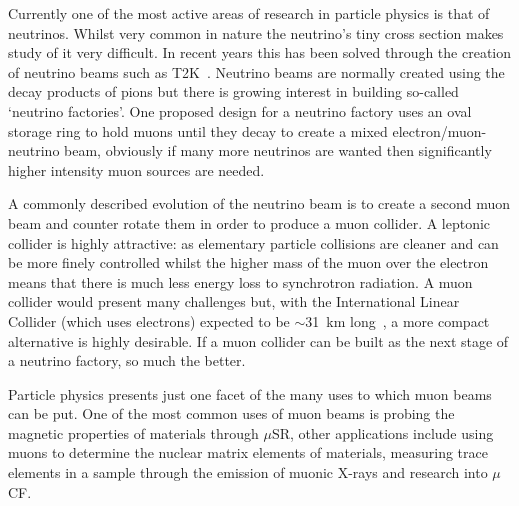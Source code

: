 Currently one of the most active areas of research in particle physics is that of neutrinos. Whilst very common in nature the neutrino's tiny cross section makes study of it very difficult. In recent years this has been solved through the creation of neutrino beams such as T2K~\cite{t2k_cdr}. Neutrino beams are normally created using the decay products of pions but there is growing interest in building so-called `neutrino factories'. One proposed design for a neutrino factory uses an oval storage ring to hold muons until they decay to create a mixed electron/muon-neutrino beam, obviously if many more neutrinos are wanted then significantly higher intensity muon sources are needed.

A commonly described evolution of the neutrino beam is to create a second muon beam and counter rotate them in order to produce a muon collider. A leptonic collider is highly attractive: as elementary particle collisions are cleaner and can be more finely controlled whilst the higher mass of the muon over the electron means that there is much less energy loss to synchrotron radiation. A muon collider would present many challenges but, with the International Linear Collider (which uses electrons) expected to be \(\sim\)31~km long~\cite{ilc}, a more compact alternative is highly desirable. If a muon collider can be built as the next stage of a neutrino factory, so much the better.

Particle physics presents just one facet of the many uses to which muon beams can be put. One of the most common uses of muon beams is probing the magnetic properties of materials through \(\mu\)SR, other applications include using muons to determine the nuclear matrix elements of materials, measuring trace elements in a sample through the emission of muonic X-rays and research into \(\mu\)CF.

